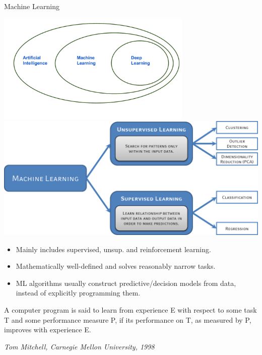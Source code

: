 \documentclass[11pt,compress,t,notes=noshow, xcolor=table]{beamer}
\begin{document}
\begin{frame}{Machine Learning}

\begin{center}
  \includegraphics[width=0.7\textwidth]{figure_man/learning}
  \includegraphics[width=0.5\textheight]{figure_man/ml-types.png}
\end{center}
      
  
\begin{itemize}
    \item Mainly includes supervised, unsup. and reinforcement learning.
	\item Mathematically well-defined and solves reasonably narrow tasks.
	\item ML algorithms usually construct predictive/decision models from data, instead of explicitly programming them.
\end{itemize}
\lz
A computer program is said to learn from experience E with respect to
  some task T and some performance measure P, if its performance on T, as 
  measured by P, improves with experience E. \\
  \begin{footnotesize}
  \emph{Tom Mitchell, Carnegie Mellon University, 1998}
  \end{footnotesize}
  
\end{frame}
\end{document}
